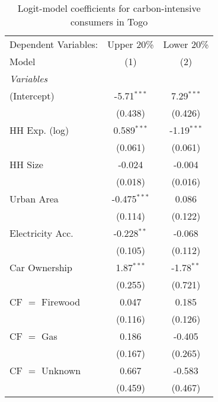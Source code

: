 
\begin{table}[htbp!]
   \centering
   \small
   \begin{adjustbox}{width = 1\textwidth, max height = 0.95\textheight, center}
      \begin{threeparttable}[b]
         \caption{\label{tab:Logit_1_TGO} Logit-model coefficients for carbon-intensive consumers in Togo}
         \begin{tabular}{lcc}
            \tabularnewline \midrule \midrule
            Dependent Variables: & Upper 20\%     & Lower 20\%\\   
            Model                & (1)            & (2)\\  
            \midrule
            \emph{Variables}\\
            (Intercept)          & -5.71$^{***}$  & 7.29$^{***}$\\   
                                 & (0.438)        & (0.426)\\   
            HH Exp. (log)        & 0.589$^{***}$  & -1.19$^{***}$\\   
                                 & (0.061)        & (0.061)\\   
            HH Size              & -0.024         & -0.004\\   
                                 & (0.018)        & (0.016)\\   
            Urban Area           & -0.475$^{***}$ & 0.086\\   
                                 & (0.114)        & (0.122)\\   
            Electricity Acc.     & -0.228$^{**}$  & -0.068\\   
                                 & (0.105)        & (0.112)\\   
            Car Ownership        & 1.87$^{***}$   & -1.78$^{**}$\\   
                                 & (0.255)        & (0.721)\\   
            CF $=$ Firewood      & 0.047          & 0.185\\   
                                 & (0.116)        & (0.126)\\   
            CF $=$ Gas           & 0.186          & -0.405\\   
                                 & (0.167)        & (0.265)\\   
            CF $=$ Unknown       & 0.667          & -0.583\\   
                                 & (0.459)        & (0.467)\\   

\end{tabular}
\end{threeparttable}
\end{adjustbox}
\end{table}
